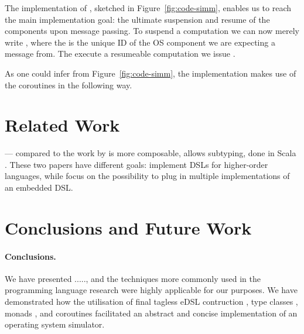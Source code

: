 The implementation of , sketched in
Figure~\ref{fig:code-simm}, enables us to reach the main
implementation goal: the ultimate suspension and resume of the
components upon message passing.  To suspend a computation we can now
merely write , where the  is
the unique ID of the OS component we are expecting a message from. The
execute a resumeable computation we issue .

As one could infer from Figure~\ref{fig:code-simm}, the implementation
makes use of the coroutines in the following way. 


\section{Related Work}
\label{sec:related-work}


\cite{house}
\cite{final_tagless_embedding}

\cite{Hofer:2008:PED:1449913.1449935} --- compared to the work by
\citeauthor{final_tagless_embedding} \cite{final_tagless_embedding} is
more composable, allows subtyping, done in Scala
\cite{odersky2008programming}. These two papers have different goals:
\citeauthor{final_tagless_embedding} implement DSLs for higher-order
languages, while \citeauthor{Hofer:2008:PED:1449913.1449935} focus on
the possibility to plug in multiple implementations of an embedded
DSL. 


\section{Conclusions and Future Work}
\label{sec:concl-future-work}

\paragraph{Conclusions.}  We have
presented ....., and the techniques more commonly used in the
programming language research were highly applicable for our
purposes. We have demonstrated how the utilisation of final tagless
eDSL contruction \cite{...}, type classes \cite{...}, monads
\cite{...}, and coroutines \cite{...} facilitated an abstract and
concise implementation of an operating system simulator.

